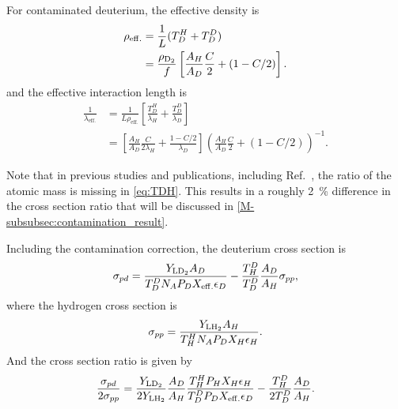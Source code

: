 \documentclass[../main.tex]{subfiles}
\begin{document}
For contaminated deuterium, the effective density is
\begin{equation}
	\begin{split}
		\rho_{\mathrm{eff.}} &= \frac{1}{L} (T_D^H + T_D^D)\\
		&=\frac{\rho_{\ce{D_2}}}{f} \left[ \frac{A_H}{A_D}\frac{C}{2}+(1-C/2) \right].
	\end{split}
\end{equation}
and the effective interaction length is
\begin{equation}
	\begin{split}
		\frac{1}{\lambda_{\mathrm{eff.}}} &= \frac{1}{L\rho_{\mathrm{eff.}}} \left[\frac{T_D^H}{\lambda_H} +\frac{T_D^D}{\lambda_D}\right]\\
		&=\left[\frac{A_H}{A_D}\frac{C}{2\lambda_H} + \frac{1-C/2}{\lambda_D}\right]\left( \frac{A_H}{A_D}\frac{C}{2} +(1-C/2)\right)^{-1}.
	\end{split}
\end{equation}

Note that in previous studies and publications, including Ref.~\cite{dove2021,dove2023},
the ratio of the atomic mass is missing in \cref{eq:TDH}.
This results in a roughly \SI{2}{\percent} difference in the cross section ratio
that will be discussed in \cref{M-subsubsec:contamination_result}.

Including the contamination correction, the deuterium cross section is
\begin{equation}
	\sigma_{pd} = \frac{Y_{\ce{LD_2}} A_D}{T_D^D N_A P_D X_{\mathrm{eff.}} \epsilon_D} - \frac{T^D_H}{T_D^D} \frac{A_D}{A_H} \sigma_{pp},
\end{equation}
where the hydrogen cross section is
\begin{equation}
	\sigma_{pp} = \frac{Y_{\ce{LH_2}} A_H}{T_H^H N_A P_D X_{H} \epsilon_H}.
\end{equation}
And the cross section ratio is given by
\begin{equation}
	\frac{\sigma_{pd}}{2\sigma_{pp}} = \frac{Y_{\ce{LD_2}}}{2Y_{\ce{LH_2}}}\frac{A_D}{A_H}\frac{T_H^H P_H X_{H} \epsilon_H}{T_D^D P_D X_{\mathrm{eff.}} \epsilon_D} - \frac{T^D_H}{2T_D^D} \frac{A_D}{A_H}.
\end{equation}
\end{document}
